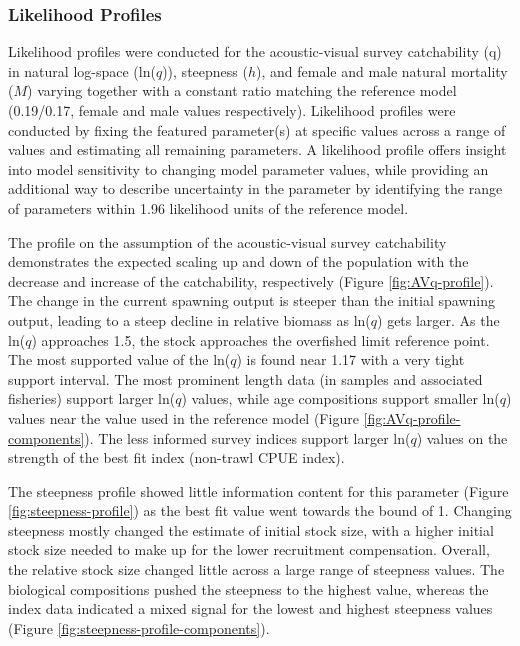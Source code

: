 \documentclass[11pt,
  english,
  letterpaper,
]{article}
\begin{document}
\hypertarget{likelihood-profiles}{%
\subsubsection{Likelihood Profiles}\label{likelihood-profiles}}

Likelihood profiles were conducted for the acoustic-visual survey catchability (q) in natural log-space (ln(\(q\))), steepness (\(h\)), and female and male natural mortality (\(M\)) varying together with a constant ratio matching the reference model (0.19/0.17, female and male values respectively). Likelihood profiles were conducted by fixing the featured parameter(s) at specific values across a range of values and estimating all remaining parameters. A likelihood profile offers insight into model sensitivity to changing model parameter values, while providing an additional way to describe uncertainty in the parameter by identifying the range of parameters within 1.96 likelihood units of the reference model.

The profile on the assumption of the acoustic-visual survey catchability demonstrates the expected scaling up and down of the population with the decrease and increase of the catchability, respectively (Figure \ref{fig:AVq-profile}). The change in the current spawning output is steeper than the initial spawning output, leading to a steep decline in relative biomass as ln(\(q\)) gets larger. As the ln(\(q\)) approaches 1.5, the stock approaches the overfished limit reference point. The most supported value of the ln(\(q\)) is found near 1.17 with a very tight support interval. The most prominent length data (in samples and associated fisheries) support larger ln(\(q\)) values, while age compositions support smaller ln(\(q\)) values near the value used in the reference model (Figure \ref{fig:AVq-profile-components}). The less informed survey indices support larger ln(\(q\)) values on the strength of the best fit index (non-trawl CPUE index).

The steepness profile showed little information content for this parameter (Figure \ref{fig:steepness-profile}) as the best fit value went towards the bound of 1. Changing steepness mostly changed the estimate of initial stock size, with a higher initial stock size needed to make up for the lower recruitment compensation. Overall, the relative stock size changed little across a large range of steepness values. The biological compositions pushed the steepness to the highest value, whereas the index data indicated a mixed signal for the lowest and highest steepness values (Figure \ref{fig:steepness-profile-components}).
\end{document}

